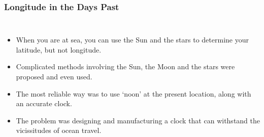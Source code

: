 \begin{frame}
\frametitle{Longitude in the Days Past}
\begin{columns}
\begin{itemize}
\item When you are at sea, you can use the Sun and the stars to determine your latitude, but not longitude.
\item Complicated methods involving the Sun, the Moon and the stars were proposed and even used.
\item The most reliable way was to use `noon' at the present location, along with an accurate clock.
\item The problem was designing and manufacturing a clock that can withstand the vicissitudes of ocean travel.
\end{itemize}
\end{columns}
\end{frame}

